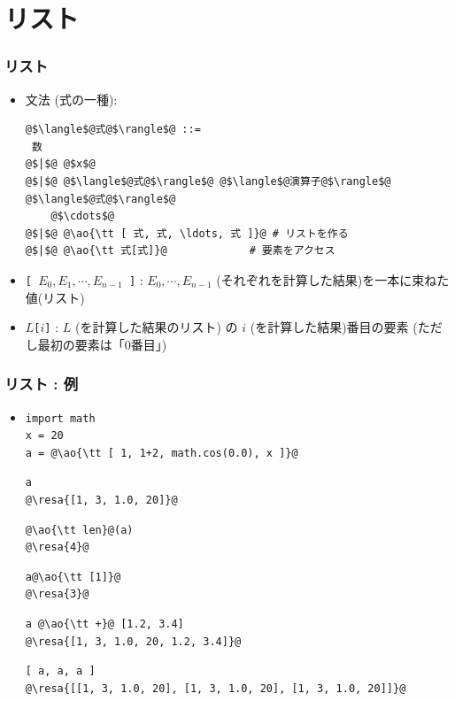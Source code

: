 \documentclass[10pt,dvipdfmx]{beamer}
\newcommand{\ore}[1]{{\color{orange}#1}}
\newcommand{\ao}[1]{{\color{blue}#1}}
\newcommand{\resa}[1]{\ore{\textsl{$\rightarrow$ #1}}}
\begin{document}
\section{リスト}

\begin{frame}[fragile]
\frametitle{リスト}
\begin{itemize}
\item 文法 (式の一種):
\begin{lstlisting}
@$\langle$@式@$\rangle$@ ::=
 数
@$|$@ @$x$@
@$|$@ @$\langle$@式@$\rangle$@ @$\langle$@演算子@$\rangle$@ @$\langle$@式@$\rangle$@
    @$\cdots$@
@$|$@ @\ao{\tt [ 式, 式, \ldots, 式 ]}@ # リストを作る
@$|$@ @\ao{\tt 式[式]}@             # 要素をアクセス
\end{lstlisting}

\item {\tt [ $E_0, E_1, \cdots, E_{n-1}$ ]} : $E_0, \cdots, E_{n-1}$ (それぞれを計算した結果)を一本に束ねた値(リスト)
\item {\tt $L$[$i$]} : $L$ (を計算した結果のリスト) の $i$ (を計算した結果)番目の要素 (ただし最初の要素は「0番目」)
\end{itemize}
\end{frame}

\begin{frame}[fragile]
\frametitle{リスト : 例}
\begin{itemize}
\item []
\begin{lstlisting}
import math
x = 20
a = @\ao{\tt [ 1, 1+2, math.cos(0.0), x ]}@
\end{lstlisting}
\begin{lstlisting}
a
@\resa{[1, 3, 1.0, 20]}@
\end{lstlisting}
\begin{lstlisting}
@\ao{\tt len}@(a)
@\resa{4}@
\end{lstlisting}
\begin{lstlisting}
a@\ao{\tt [1]}@
@\resa{3}@
\end{lstlisting}
\begin{lstlisting}
a @\ao{\tt +}@ [1.2, 3.4]
@\resa{[1, 3, 1.0, 20, 1.2, 3.4]}@
\end{lstlisting}
\begin{lstlisting}
[ a, a, a ]
@\resa{[[1, 3, 1.0, 20], [1, 3, 1.0, 20], [1, 3, 1.0, 20]]}@
\end{lstlisting}
\end{itemize}
\end{frame}
\end{document}

